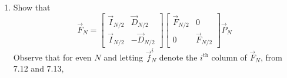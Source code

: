 \documentclass[journal,12pt,twocolumn]{IEEEtran}
\renewcommand\thesection{\arabic{section}}
\begin{document}
\begin{enumerate}[label=\thesection.\arabic*
	,ref=\thesection.\theenumi]
\begin{enumerate}[label=\arabic*.,ref=\thesection.\theenumi]
\begin{equation}
\begin{bmatrix}
		1	&	1	&	-1	&	-1\\
		1	&	-1	&	i	&	-i\\
	\end{bmatrix}\vec{P}_{4}\\
\end{equation}
\begin{equation}
	=\begin{bmatrix}
		1	&	1	&	1	&	1\\
		1	&	-i	&	-1	&	i\\
		1	&	-1	&	1	&	-1\\
		1	&	i	&	-1	&	-i\\
	\end{bmatrix}\\
\end{equation}
\begin{equation}
	\text{LHS} = \vec{F}_{4}
	= \begin{bmatrix}
		W_{4}^0	&	W_{4}^0	&	W_{4}^0	&	W_{4}^0\\
		W_{4}^0	&	W_{4}^1	&	W_{4}^2	&	W_{4}^3\\
		W_{4}^0	&	W_{4}^2	&	W_{4}^4	&	W_{4}^6\\
		W_{4}^0	&	W_{4}^3	&	W_{4}^6	&	W_{4}^9\\
	\end{bmatrix}\\
\end{equation}
\begin{equation}
	= \begin{bmatrix}
		1	&	1	&	1	&	1\\
		1	&	-i	&	-1	&	i\\
		1	&	-1	&	1	&	-1\\
		1	&	i	&	-1	&	-i\\
	\end{bmatrix}\\
\end{equation}
\item Show that 
\begin{equation}
	\vec{F}_{N}=
	\begin{bmatrix}
		\vec{I}_{N/2} & \vec{D}_{N/2} \\
		\vec{I}_{N/2} & -\vec{D}_{N/2}
	\end{bmatrix}
	\begin{bmatrix}
		\vec{F}_{N/2} & 0 \\
		0 & \vec{F}_{N/2}
	\end{bmatrix}
	\vec{P}_{N}
\end{equation}
\solution Observe that for even $N$ and letting $\vec{f}_N^i$ denote the $i^{\text{th}}$ column of $\vec{F}_N$, from 7.12 and 7.13,

\end{enumerate}
\end{enumerate}
\end{document}
